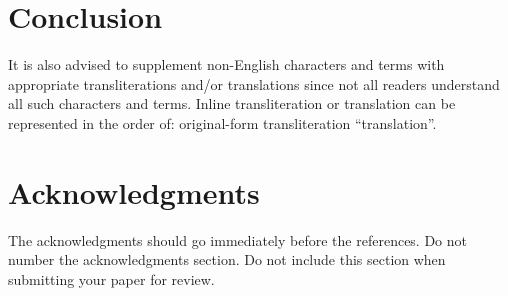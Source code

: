 \documentclass[11pt,a4paper]{article}
\begin{document}



\section{Conclusion}

It is also advised to supplement non-English characters and terms
with appropriate transliterations and/or translations
since not all readers understand all such characters and terms.
Inline transliteration or translation can be represented in
the order of: original-form transliteration ``translation''.

\section*{Acknowledgments}

The acknowledgments should go immediately before the references.  Do
not number the acknowledgments section. Do not include this section
when submitting your paper for review. \\
\end{document}

